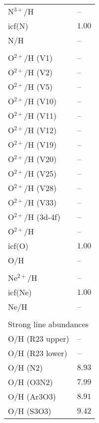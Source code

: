 \begin{longtable}[l]{ll}
 N$^{3+}$/H                          & -- \\
 icf(N)                              & $  1.00$\\
 N/H                                 & -- \\
 \\
 O$^{2+}$/H (V1)                     & -- \\
 O$^{2+}$/H (V2)                     & -- \\
 O$^{2+}$/H (V5)                     & -- \\
 O$^{2+}$/H (V10)                    & -- \\
 O$^{2+}$/H (V11)                    & -- \\
 O$^{2+}$/H (V12)                    & -- \\
 O$^{2+}$/H (V19)                    & -- \\
 O$^{2+}$/H (V20)                    & -- \\
 O$^{2+}$/H (V25)                    & -- \\
 O$^{2+}$/H (V28)                    & -- \\
 O$^{2+}$/H (V33)                    & -- \\
 O$^{2+}$/H (3d-4f)                  & -- \\
 O$^{2+}$/H                          & -- \\
 icf(O)                              & $  1.00$\\
 O/H                                 & -- \\
 \\
 Ne$^{2+}$/H                         & -- \\
 icf(Ne)                             & $  1.00$\\
 Ne/H                                & -- \\
 \vspace{0.2cm}\\\multicolumn{2}{l}{Strong line abundances}\\ \hline
 O/H (R23 upper)                     & -- \\
 O/H (R23 lower)                     & -- \\
 O/H (N2)                            & $  8.93$\\
 O/H (O3N2)                          & $  7.99$\\
 O/H (Ar3O3)                         & $  8.91$\\
 O/H (S3O3)                          & $  9.42$\\

\end{longtable}
